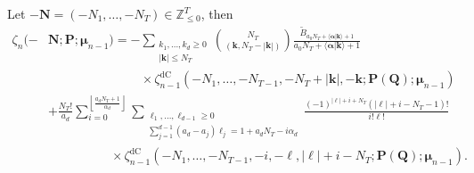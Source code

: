 \documentclass[10pt,a4paper]{amsart}
\newcommand{\dc}{\mathrm{dC}}
\begin{document}
\begin{thm}
\label{th:value_zeta_n}
Let $-\mathbf{N}=(-N_1,\ldots,-N_T) \in \mathbb{Z}_{\leq 0}^T$, then
\begin{align}
    \zeta_{n}(-&\mathbf{N};\mathbf{P};\boldsymbol{\mu}_{n-1})=-\sum_{\substack{k_1,\ldots,k_d \geq 0 \\ |\mathbf{k}| \leq N_T}} \binom{N_T}{(\mathbf{k},N_T-|\mathbf{k}|)} \frac{\widetilde{B}_{a_0N_T+\langle \boldsymbol{\alpha}|\mathbf{k}\rangle+1}}{a_0N_T+\langle \boldsymbol{\alpha}|\mathbf{k} \rangle+1} \label{eq:values_zeta_n} \\
    & \hspace{89pt} \times \zeta_{n-1}^{\dc}(-N_1,\ldots,-N_{T-1},-N_T+|\mathbf{k}|,-\mathbf{k};\mathbf{P(Q)};\boldsymbol{\mu}_{n-1}) \nonumber \\
    &+ \frac{N_T!}{a_d}\sum_{i=0}^{\left\lfloor \frac{a_dN_T+1}{\alpha_d}\right\rfloor} \sum_{\substack{\ell_1,\ldots,\ell_{d-1} \geq 0 \\ \sum_{j=1}^{d-1} (a_d-a_j) \ell_j=1+a_dN_T-i\alpha_d}} \frac{(-1)^{|\boldsymbol{\ell}|+i+N_T}(|\boldsymbol{\ell}|+i-N_T-1)!}{i!\boldsymbol{\ell}!} \nonumber \\
    & \hspace{60pt} \times \zeta_{n-1}^{\dc}(-N_1,\ldots,-N_{T-1},-i,-\boldsymbol{\ell},|\boldsymbol{\ell}|+i-N_T;\mathbf{P(Q)};\boldsymbol{\mu}_{n-1}). \nonumber
\end{align}
\end{thm}
\end{document}
